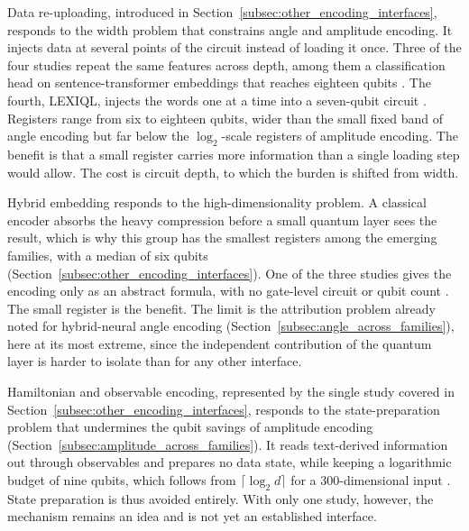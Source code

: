 \documentclass{ieeeaccess}
\begin{document}
Data re-uploading, introduced in Section~\ref{subsec:other_encoding_interfaces}, responds to the width problem that constrains angle and amplitude encoding.
It injects data at several points of the circuit instead of loading it once. Three of the four studies repeat the same features across depth, among them a classification head on sentence-transformer embeddings that reaches eighteen qubits \cite{kim_quantum_2025}. The fourth, LEXIQL, injects the words one at a time into a seven-qubit circuit \cite{silver_lexiql_2024}. Registers range from six to eighteen qubits, wider than the small fixed band of angle encoding but far below the $\log_2$-scale registers of amplitude encoding.
The benefit is that a small register carries more information than a single loading step would allow. The cost is circuit depth, to which the burden is shifted from width.

Hybrid embedding responds to the high-dimensionality problem.
A classical encoder absorbs the heavy compression before a small quantum layer sees the result, which is why this group has the smallest registers among the emerging families, with a median of six qubits (Section~\ref{subsec:other_encoding_interfaces}). One of the three studies gives the encoding only as an abstract formula, with no gate-level circuit or qubit count \cite{bikku_quantum-enhanced_2025}.
The small register is the benefit. The limit is the attribution problem already noted for hybrid-neural angle encoding (Section~\ref{subsec:angle_across_families}), here at its most extreme, since the independent contribution of the quantum layer is harder to isolate than for any other interface.

Hamiltonian and observable encoding, represented by the single study covered in Section~\ref{subsec:other_encoding_interfaces}, responds to the state-preparation problem that undermines the qubit savings of amplitude encoding (Section~\ref{subsec:amplitude_across_families}).
It reads text-derived information out through observables and prepares no data state, while keeping a logarithmic budget of nine qubits, which follows from $\lceil\log_2 d\rceil$ for a 300-dimensional input \cite{tiblias_efficient_2026}.
State preparation is thus avoided entirely. With only one study, however, the mechanism remains an idea and is not yet an established interface.
\end{document}
